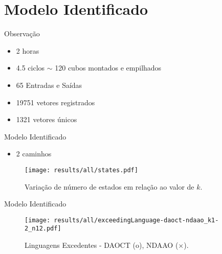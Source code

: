 
\section{Modelo Identificado}


\begin{frame}{Observação}
\begin{itemize}
\item 2 horas 
\item 4.5 ciclos \quad$\sim$ 120 cubos montados e empilhados
\item 65 Entradas e Saídas
\item 19751 vetores registrados
\item 1321 vetores únicos
\end{itemize}\end{frame}


\begin{frame}{Modelo Identificado}
\begin{itemize}
\item 2 caminhos 
\end{itemize}
\begin{figure}[H]
  \centering
  \texttt{[image: results/all/states.pdf]}
  \caption{Variação de número de estados em relação ao valor de $k$.}
    \label{fig:statesIdentOriginal}
  \end{figure}
\end{frame}

\begin{frame}{Modelo Identificado}
\begin{figure}[H]
  \centering
  \texttt{[image: results/all/exceedingLanguage-daoct-ndaao\_k1-2\_n12.pdf]}
  \caption{Linguagens Excedentes - DAOCT (o), NDAAO ($\times$).}
    \label{fig:daoctNdaaoOriginal}
\end{figure}
\end{frame}


